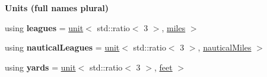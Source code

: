 \begin{Indent}{\bf Units (full names plural)}
\begin{DoxyCompactItemize}
\item 
\hypertarget{namespaceunits_1_1length_a69df4f968a2009f550c195973ba3924f}{}using {\bfseries leagues} = \hyperlink{structunits_1_1unit}{unit}$<$ std\+::ratio$<$ 3 $>$, \hyperlink{structunits_1_1unit}{miles} $>$\label{namespaceunits_1_1length_a69df4f968a2009f550c195973ba3924f}

\item 
\hypertarget{namespaceunits_1_1length_a57f23be6dfc82555433eba423a0ef49a}{}using {\bfseries nautical\+Leagues} = \hyperlink{structunits_1_1unit}{unit}$<$ std\+::ratio$<$ 3 $>$, \hyperlink{structunits_1_1unit}{nautical\+Miles} $>$\label{namespaceunits_1_1length_a57f23be6dfc82555433eba423a0ef49a}

\item 
\hypertarget{namespaceunits_1_1length_a099803d1f5337a7c37b9612533e3db71}{}using {\bfseries yards} = \hyperlink{structunits_1_1unit}{unit}$<$ std\+::ratio$<$ 3 $>$, \hyperlink{structunits_1_1unit}{feet} $>$\label{namespaceunits_1_1length_a099803d1f5337a7c37b9612533e3db71}

\end{DoxyCompactItemize}
\end{Indent}
